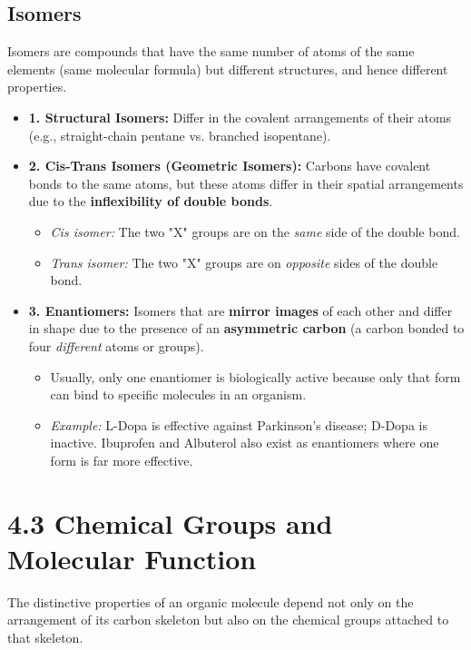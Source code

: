 \documentclass[11pt, a4paper]{article}
\begin{document}
\subsection*{Isomers}
Isomers are compounds that have the same number of atoms of the same elements (same molecular formula) but different structures, and hence different properties.
\begin{itemize}
    \item \textbf{1. Structural Isomers:} Differ in the covalent arrangements of their atoms (e.g., straight-chain pentane vs. branched isopentane).
    \item \textbf{2. Cis-Trans Isomers (Geometric Isomers):} Carbons have covalent bonds to the same atoms, but these atoms differ in their spatial arrangements due to the \textbf{inflexibility of double bonds}.
    \begin{itemize}
        \item \textit{Cis isomer:} The two "X" groups are on the \textit{same} side of the double bond.
        \item \textit{Trans isomer:} The two "X" groups are on \textit{opposite} sides of the double bond.
    \end{itemize}
    \item \textbf{3. Enantiomers:} Isomers that are \textbf{mirror images} of each other and differ in shape due to the presence of an \textbf{asymmetric carbon} (a carbon bonded to four \textit{different} atoms or groups). 
    \begin{itemize}
        \item Usually, only one enantiomer is biologically active because only that form can bind to specific molecules in an organism.
        \item \textit{Example:} L-Dopa is effective against Parkinson's disease; D-Dopa is inactive. Ibuprofen and Albuterol also exist as enantiomers where one form is far more effective.
    \end{itemize}
\end{itemize}

\section*{4.3 Chemical Groups and Molecular Function}
The distinctive properties of an organic molecule depend not only on the arrangement of its carbon skeleton but also on the chemical groups attached to that skeleton.
\end{document}
